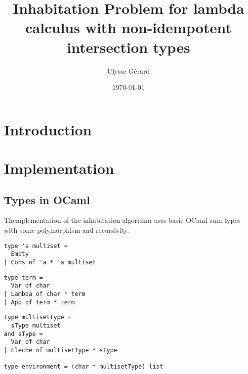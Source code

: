 \documentclass{article}
\title{\textbf{Inhabitation Problem for lambda calculus with non-idempotent intersection types}}
\author{Ulysse Gérard}
\date\today
\begin{document}
\maketitle

\section{Introduction}


\section{Implementation}
\subsection{Types in OCaml}
Themplementation of the inhabitation algorithm uses basic OCaml sum types with some polymorphism and recursivity.

\begin{lstlisting}[caption={Multisets}]
type 'a multiset =
  Empty
| Cons of 'a * 'a multiset
\end{lstlisting}

\begin{lstlisting}[caption={$\lambda$-calculus}]
type term = 
  Var of char
| Lambda of char * term 
| App of term * term
\end{lstlisting}

\begin{lstlisting}[caption={Intersection types and environments}]
type multisetType = 
  sType multiset
and sType = 
  Var of char
| Fleche of multisetType * sType

type environment = (char * multisetType) list
\end{lstlisting}
\end{document}
